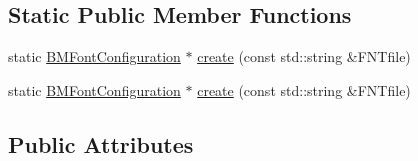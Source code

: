 \subsection*{Static Public Member Functions}
\begin{DoxyCompactItemize}
\item 
static \hyperlink{classBMFontConfiguration}{B\+M\+Font\+Configuration} $\ast$ \hyperlink{group__label_gaf6f6e33acf57e6fdf10de805002f21c6}{create} (const std\+::string \&F\+N\+Tfile)
\item 
static \hyperlink{classBMFontConfiguration}{B\+M\+Font\+Configuration} $\ast$ \hyperlink{classBMFontConfiguration_gaf6f6e33acf57e6fdf10de805002f21c6}{create} (const std\+::string \&F\+N\+Tfile)
\end{DoxyCompactItemize}
\subsection*{Public Attributes}
